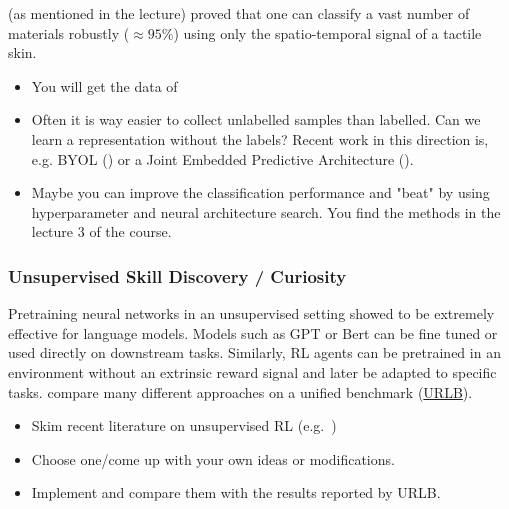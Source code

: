 \documentclass[a4paper]{article}
\begin{document}
\citet{Tulbure2018} (as mentioned in the lecture) proved that one can classify a vast number of materials robustly ($\approx 95 \%$) using only the spatio-temporal signal of a tactile skin.

\begin{itemize}
  \item You will get the data of \citet{Tulbure2018}
  \item Often it is way easier to collect unlabelled samples than labelled. Can we learn a representation without the labels? Recent work in this direction is, e.g. BYOL (\citet{Grill2020}) or a Joint Embedded Predictive Architecture (\citet{assran2023selfsupervised}).
  \item Maybe you can improve the classification performance and "beat" \citet{Tulbure2018} by using hyperparameter and neural architecture search. You find the methods in the lecture 3 of the course.
\end{itemize}

%


\subsubsection{Unsupervised Skill Discovery / Curiosity}
Pretraining neural networks in an unsupervised setting showed to be extremely effective for language models. Models such as GPT or Bert can be fine tuned or used directly on downstream tasks.
Similarly, RL agents can be pretrained in an environment without an extrinsic reward signal and later be adapted to specific tasks.
\citet{Laskin2021} compare many different approaches on a unified benchmark (\href{https://github.com/rll-research/url_benchmark}{URLB}).
\begin{itemize}
  \item Skim recent literature on unsupervised RL (e.g.~\cite{Hafner2023, Laskin2022, Li2023InternalReward})
  \item Choose one/come up with your own ideas or modifications.
  \item Implement and compare them with the results reported by URLB.
\end{itemize}
\end{document}
